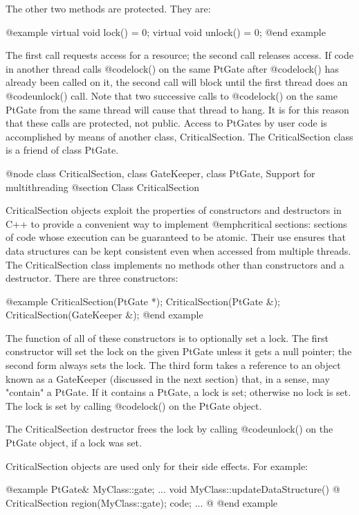 The other two methods are protected.  They are:

@example
virtual void lock() = 0;
virtual void unlock() = 0;
@end example

The first call requests access for a resource; the second call releases
access.  If code in another thread calls @code{lock()} on the same
PtGate after @code{lock()} has already been called on it, the second
call will block until the first thread does an @code{unlock()} call.
Note that two successive calls to @code{lock()} on the same PtGate from
the same thread will cause that thread to hang.  It is for this reason
that these calls are protected, not public.  Access to PtGates by user
code is accomplished by means of another class, CriticalSection.  The
CriticalSection class is a friend of class PtGate.

@node class CriticalSection, class GateKeeper, class PtGate, Support for multithreading
@section Class CriticalSection

CriticalSection objects exploit the properties of constructors and
destructors in C++ to provide a convenient way to implement
@emph{critical sections}: sections of code whose execution can be
guaranteed to be atomic.  Their use ensures that data structures can be
kept consistent even when accessed from multiple threads.  The
CriticalSection class implements no methods other than constructors and
a destructor.  There are three constructors:

@example
CriticalSection(PtGate *);
CriticalSection(PtGate &);
CriticalSection(GateKeeper &);
@end example

The function of all of these constructors is to optionally set a lock.
The first constructor will set the lock on the given PtGate unless it
gets a null pointer; the second form always sets the lock.  The third
form takes a reference to an object known as a GateKeeper (discussed in
the next section) that, in a sense, may "contain" a PtGate.  If it
contains a PtGate, a lock is set; otherwise no lock is set.  The lock
is set by calling @code{lock()} on the PtGate object.

The CriticalSection destructor frees the lock by calling @code{unlock()}
on the PtGate object, if a lock was set.

CriticalSection objects are used only for their side effects.  For
example:

@example
PtGate& MyClass::gate;
...
void MyClass::updateDataStructure() @{
        CriticalSection region(MyClass::gate);
        code;
        ...
@}
@end example

